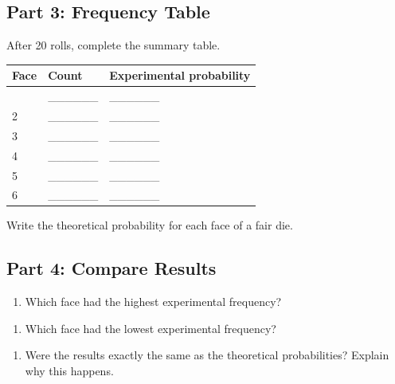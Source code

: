 \subsection{Part 3: Frequency Table}\label{part-3-frequency-table}

After 20 rolls, complete the summary table.

{\def\LTcaptype{none} %
\begin{longtable}[]{@{}lll@{}}
\toprule\noalign{}
Face & Count & Experimental probability \\
\midrule\noalign{}
\endhead
\bottomrule\noalign{}
\endlastfoot
1 & \_\_\_\_\_\_ & \_\_\_\_\_\_ \\
2 & \_\_\_\_\_\_ & \_\_\_\_\_\_ \\
3 & \_\_\_\_\_\_ & \_\_\_\_\_\_ \\
4 & \_\_\_\_\_\_ & \_\_\_\_\_\_ \\
5 & \_\_\_\_\_\_ & \_\_\_\_\_\_ \\
6 & \_\_\_\_\_\_ & \_\_\_\_\_\_ \\
\end{longtable}
}

Write the theoretical probability for each face of a fair die.

\vspace{2.2cm}

\subsection{Part 4: Compare Results}\label{part-4-compare-results}

\begin{enumerate}
\def\labelenumi{\arabic{enumi}.}
\tightlist
\item
  Which face had the highest experimental frequency?
\end{enumerate}

\vspace{1.8cm}

\begin{enumerate}
\def\labelenumi{\arabic{enumi}.}
\setcounter{enumi}{1}
\tightlist
\item
  Which face had the lowest experimental frequency?
\end{enumerate}

\vspace{1.8cm}

\begin{enumerate}
\def\labelenumi{\arabic{enumi}.}
\setcounter{enumi}{2}
\tightlist
\item
  Were the results exactly the same as the theoretical probabilities?
  Explain why this happens.
\end{enumerate}

